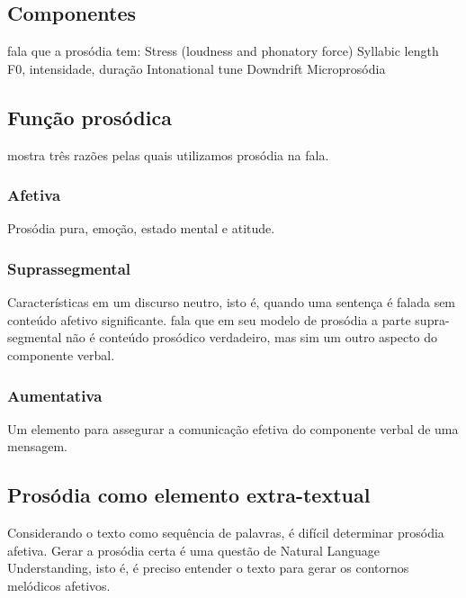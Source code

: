 \subsection{Componentes}
 fala que a prosódia tem:
Stress (loudness and phonatory force)
Syllabic length
F0, intensidade, duração
Intonational tune
Downdrift
Microprosódia
\subsection{Função prosódica}
 mostra três razões pelas quais utilizamos prosódia na fala.
\subsubsection{Afetiva}
Prosódia pura, emoção, estado mental e atitude. 
\subsubsection{Suprassegmental}
Características em um discurso neutro, isto é, quando uma sentença é falada sem
conteúdo afetivo significante.  fala que em seu modelo de
prosódia a parte supra-segmental não é conteúdo prosódico verdadeiro, mas sim
um outro aspecto do componente verbal.
\subsubsection{Aumentativa}
Um elemento para assegurar a comunicação efetiva do componente verbal de uma mensagem.
\subsection{Prosódia como elemento extra-textual}
Considerando o texto como sequência de palavras, é difícil determinar prosódia
afetiva.
Gerar a prosódia certa é uma questão de Natural Language Understanding, isto é,
é preciso entender o texto para gerar os contornos melódicos afetivos.